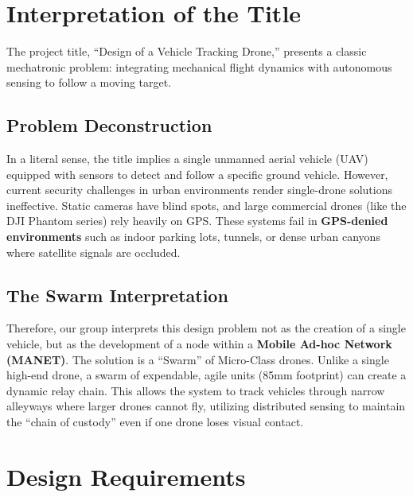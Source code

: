 \documentclass[12pt, a4paper]{article}
\begin{document}
\newpage
\tableofcontents
\newpage
\listoffigures
\listoftables
\newpage

\section{Interpretation of the Title}

The project title, ``Design of a Vehicle Tracking Drone,'' presents a classic mechatronic problem: integrating mechanical flight dynamics with autonomous sensing to follow a moving target. 

\subsection{Problem Deconstruction}
In a literal sense, the title implies a single unmanned aerial vehicle (UAV) equipped with sensors to detect and follow a specific ground vehicle. However, current security challenges in urban environments render single-drone solutions ineffective. Static cameras have blind spots, and large commercial drones (like the DJI Phantom series) rely heavily on GPS. These systems fail in \textbf{GPS-denied environments} such as indoor parking lots, tunnels, or dense urban canyons where satellite signals are occluded.

\subsection{The Swarm Interpretation}
Therefore, our group interprets this design problem not as the creation of a single vehicle, but as the development of a node within a \textbf{Mobile Ad-hoc Network (MANET)}. The solution is a ``Swarm'' of Micro-Class drones. Unlike a single high-end drone, a swarm of expendable, agile units (85mm footprint) can create a dynamic relay chain. This allows the system to track vehicles through narrow alleyways where larger drones cannot fly, utilizing distributed sensing to maintain the ``chain of custody'' even if one drone loses visual contact.

\section{Design Requirements}
\end{document}
